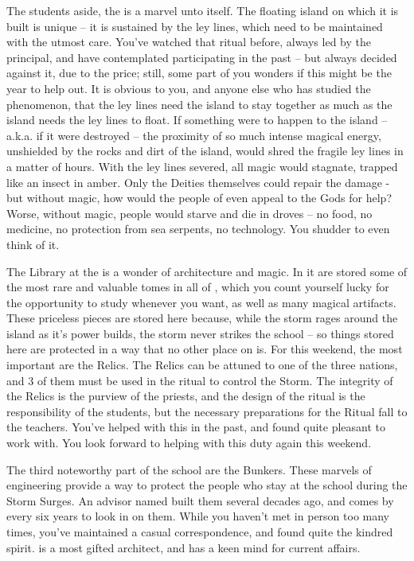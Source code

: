 \documentclass[char]{GL2020}
\begin{document}
The students aside, the \pSc{} is a marvel unto itself. The floating island on which it is built is unique -- it is sustained by the ley lines, which need to be maintained with the utmost care. You've watched that ritual before, always led by the principal, and have contemplated participating in the past -- but always decided against it, due to the price; still, some part of you wonders if this might be the year to help out. It is obvious to you, and anyone else who has studied the phenomenon, that the ley lines need the island to stay together as much as the island needs the ley lines to float. If something were to happen to the island -- a.k.a. if it were destroyed -- the proximity of so much intense magical energy, unshielded by the rocks and dirt of the island, would shred the fragile ley lines in a matter of hours. With the ley lines severed, all magic would stagnate, trapped like an insect in amber. Only the Deities themselves could repair the damage - but without magic, how would the people of \pEarth{} even appeal to the Gods for help? Worse, without magic, people would starve and die in droves – no food, no medicine, no protection from sea serpents, no technology. You shudder to even think of it.

The Library at the \pSc{} is a wonder of architecture and magic. In it are stored some of the most rare and valuable tomes in all of \pEarth{}, which you count yourself lucky for the opportunity to study whenever you want, as well as many magical artifacts. These priceless pieces are stored here because, while the storm rages around the island as it's power builds, the storm never strikes the school -- so things stored here are protected in a way that no other place on \pEarth{} is. For this weekend, the most important are the Relics. The Relics can be attuned to one of the three nations, and 3 of them must be used in the ritual to control the Storm. The integrity of the Relics is the purview of the priests, and the design of the ritual is the responsibility of the students, but the necessary preparations for the Ritual fall to the teachers. You've helped \cLibrarian{\full} with this in the past, and found \cLibrarian{\them} quite pleasant to work with. You look forward to helping with this duty again this weekend. 

The third noteworthy part of the school are the Bunkers. These marvels of engineering provide a way to protect the people who stay at the school during the Storm Surges. An advisor named \cBunker{\full} built them several decades ago, and comes by every six years to look in on them. While you haven't met \cBunker{\them} in person too many times, you've maintained a casual correspondence, and found quite the kindred spirit. \cBunker{} is a most gifted architect, and has a keen mind for current affairs.
\end{document}
